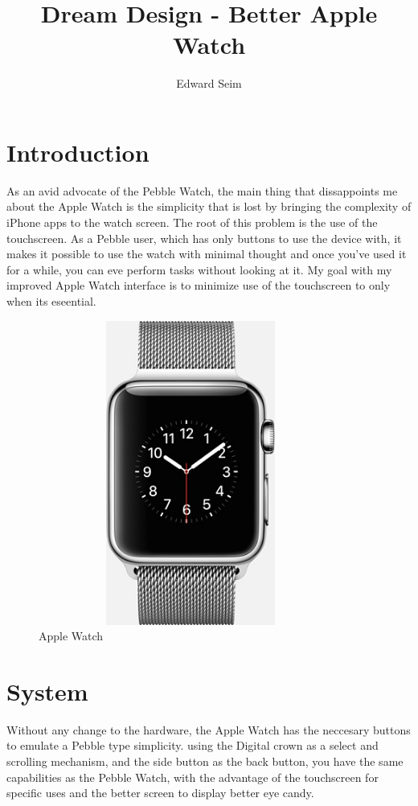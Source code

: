 \documentclass[journal,letterpaper]{article}
\title{Dream Design - Better Apple Watch}
\author{Edward Seim}
\begin{document}
    \maketitle
    
    \section{Introduction}
    \label{introduction}

    As an avid advocate of the Pebble Watch, the main thing that dissappoints me about the Apple Watch is the simplicity that is lost by bringing the complexity of iPhone apps to the watch screen. The root of this problem is the use of the touchscreen. As a Pebble user, which has only buttons to use the device with, it makes it possible to use the watch with minimal thought and once you've used it for a while, you can eve perform tasks without looking at it. My goal with my improved Apple Watch interface is to minimize use of the touchscreen to only when its eseential.

    \begin{figure}[htbp]
        \centering
        \includegraphics[width=10cm,height=10cm,keepaspectratio]{apple-watch}
        \caption{Apple Watch}
        \label{fig:apple_watch}
    \end{figure}

    \section{System}
    \label{System}

    Without any change to the hardware, the Apple Watch has the neccesary buttons to emulate a Pebble type simplicity. using the Digital crown as a select and scrolling mechanism, and the side button as the back button, you have the same capabilities as the Pebble Watch, with the advantage of the touchscreen for specific uses and the better screen to display better eye candy.
\end{document}
